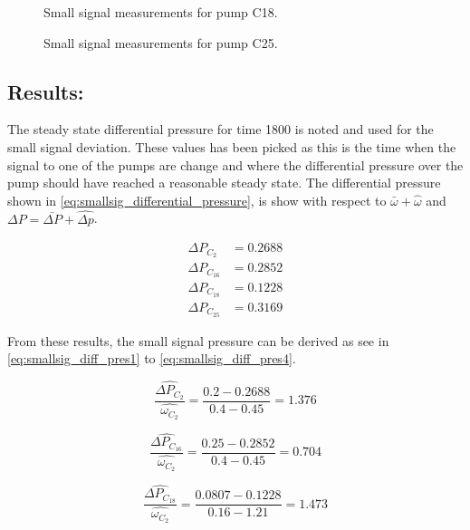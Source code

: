 \begin{figure}[H]

\caption{Small signal measurements for pump C18.}
\label{fig:small_sig_diff_press_C18}
\end{figure}

\begin{figure}[H]

\caption{Small signal measurements for pump C25.}
\label{fig:small_sig_diff_press_C25}
\end{figure}



\subsection*{Results:}
The steady state differential pressure for time 1800 is noted and used for the small signal deviation. These values has been picked as this is the time when the signal to one of the pumps are change and where the differential pressure over the pump should have reached a reasonable steady state. The differential pressure shown in \eqref{eq:smallsig_differential_pressure}, is show with respect to $\bar{\omega} + \hat{\omega}$ and $\Delta P = \bar{\Delta P} + \hat{\Delta p}$.

\begin{equation}
	\begin{split}
	\Delta P_{C_2} &= 0.2688 \\
	\Delta P_{C_{16}} &= 0.2852 \\
	\Delta P_{C_{18}} &= 0.1228 \\
	\Delta P_{C_{25}} &= 0.3169
	\end{split}
	\label{eq:smallsig_differential_pressure}
\end{equation}

From these results, the small signal pressure can be derived as see in \eqref{eq:smallsig_diff_pres1} to \eqref{eq:smallsig_diff_pres4}.

\begin{equation}
\frac{\hat{\Delta P_{C_2}}}{\hat{\omega_{C_2}}} = \frac{0.2 - 0.2688}{0.4 - 0.45} =  1.376
\label{eq:smallsig_diff_pres1}
\end{equation}

\begin{equation}
\frac{\hat{\Delta P_{C_16}}}{\hat{\omega_{C_2}}} = \frac{0.25-0.2852}{0.4-0.45} =  0.704
\label{eq:smallsig_diff_pres2}
\end{equation}

\begin{equation}
\frac{\hat{\Delta P_{C_18}}}{\hat{\omega_{C_2}}} = \frac{0.0807 - 0.1228}{0.16 - 1.21} = 1.473 
\label{eq:smallsig_diff_pres3}
\end{equation}

